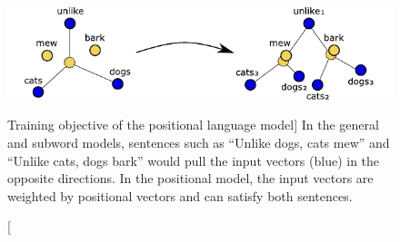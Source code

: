\begin{figure}
\includegraphics{positional-model}
\caption
  [Training objective of the positional language model]%
  {In the general and subword models, sentences such as
   ``Unlike dogs, cats mew'' and ``Unlike cats, dogs bark''
   would pull the input vectors (blue) in the opposite directions.  In the
   positional model, the input vectors are weighted by positional vectors
   and can satisfy both sentences.}
\label{fig:positional-model}
\end{figure}
